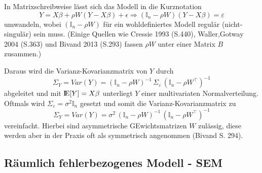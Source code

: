 In Matrixschreibweise lässt sich das Modell in die Kurznotation
\begin{equation*}
    Y=X \beta + \rho W (Y-X \beta) + \epsilon  \Rightarrow  (\mathds{I}_{n}-\rho W) (Y-X \beta) = \varepsilon
\end{equation*}
umwandeln, wobei $(\mathds{I}_{n}-\rho W)$ für ein wohldefiniertes Modell regulär (nicht-singulär) sein muss.
(Einige Quellen wie Cressie 1993 (S.440), Waller,Gotway 2004 (S.363) und Bivand 2013 (S.293) fassen $\rho W$ unter einer Matrix $B$ zusammen.)

Daraus wird die Varianz-Kovarianzmatrix von $Y$ durch
\begin{equation*}
    \Sigma_{Y}=Var(Y) = (\mathds{I}_{n}-\rho W)^{-1} \, \Sigma_{\varepsilon} \, (\mathds{I}_{n}-\rho W^{\intercal})^{-1}
\end{equation*}
abgeleitet und mit ${\rm I\!E}[Y]=X \beta$ unterliegt $Y$ einer multivariaten Normalverteilung. 
Oftmals wird $\Sigma_{\varepsilon}=\sigma^{2} \mathds{I}_{n}$ gesetzt und somit die Varianz-Kovarianzmatrix zu
\begin{equation*}
    \Sigma_{Y}=Var(Y) = \sigma^{2} \, (\mathds{I}_{n}-\rho W)^{-1} \, (\mathds{I}_{n}-\rho W^{\intercal})^{-1}
\end{equation*}
vereinfacht. Hierbei sind asymmetrische GEwichtsmatrizen $W$ zulässig, diese werden aber in der Praxis 
oft als symmetrisch angenommen (Bivand S. 294).

\subsection{Räumlich fehlerbezogenes Modell - SEM}

